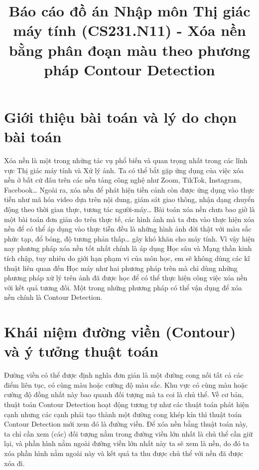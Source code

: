 \documentclass[conference]{IEEEtran}
\begin{document}
\title{Báo cáo đồ án Nhập môn Thị giác máy tính (CS231.N11) - Xóa nền bằng phân đoạn màu theo phương pháp Contour Detection}



\author{
}

\maketitle


\section{Giới thiệu bài toán và lý do chọn bài toán}
Xóa nền là một trong những tác vụ phổ biến và quan trọng nhất trong các lĩnh vực Thị giác máy tính và Xử lý ảnh. Ta có thể bắt gặp ứng dụng của việc xóa nền ở bất cứ đâu trên các nền tảng công nghệ như Zoom, TikTok, Instagram, Facebook… Ngoài ra, xóa nền để phát hiện tiền cảnh còn được ứng dụng vào thực tiễn như mã hóa video dựa trên nội dung, giám sát giao thông, nhận dạng chuyển động theo thời gian thực, tương tác người-máy… Bài toán xóa nền chưa bao giờ là một bài toán đơn giản do trên thực tế, các hình ảnh mà ta đưa vào thực hiện xóa nền để có thể áp dụng vào thực tiễn đều là những hình ảnh đời thật với màu sắc phức tạp, đổ bóng, độ tương phản thấp… gây khó khăn cho máy tính. Vì vậy hiện nay phương pháp xóa nền tốt nhất chính là áp dụng Học sâu và Mạng thần kinh tích chập, tuy nhiên do giới hạn phạm vi của môn học, em sẽ không dùng các kĩ thuật liên quan đến Học máy như hai phương pháp trên mà chỉ dùng những phương pháp xử lý trên ảnh đã được học để có thể thực hiện công việc xóa nền với kết quả tương đối. Một trong những phương pháp có thể vận dụng để xóa nền chính là Contour Detection.
\section{Khái niệm đường viền (Contour) và ý tưởng thuật toán}
Đường viền có thể được định nghĩa đơn giản là một đường cong nối tất cả các điểm liên tục, có cùng màu hoặc cường độ màu sắc. Khu vực có cùng màu hoặc cường độ đồng nhất này bao quanh đối tượng mà ta coi là chủ thể. Về cơ bản, thuật toán Contour Detection hoạt động tương tự như các thuật toán phát hiện cạnh nhưng các cạnh phải tạo thành một đường cong khép kín thì thuật toán Contour Detection mới xem đó là đường viền. Để xóa nền bằng thuật toán này, ta chỉ cần xem (các) đối tượng nằm trong đường viền lớn nhất là chủ thể cần giữ lại, và phần hình nằm ngoài đường viền lớn nhất này ta sẽ xem là nền, do đó ta xóa phần hình nằm ngoài này và kết quả ta thu được chủ thể với nền đã được xóa đi.
\end{document}

